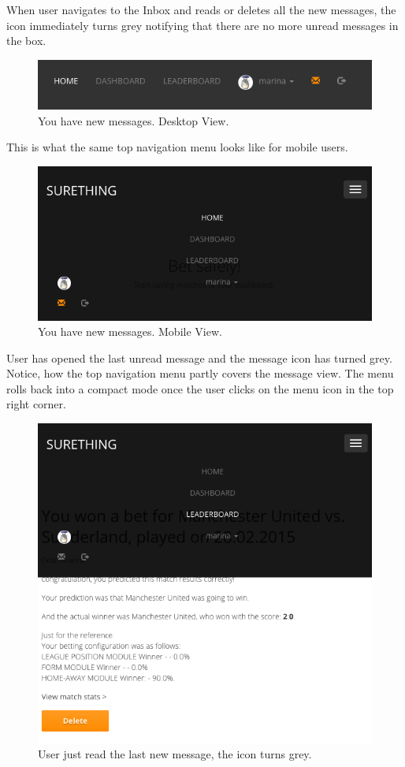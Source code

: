 When user navigates to the Inbox and reads or deletes all the new messages, the icon immediately turns grey notifying that there are no more unread messages in the box.
 
\begin{figure}[H]
	\begin{center}
		\includegraphics[width=.60\linewidth,natwidth=610,natheight=642]{impl/images/newMessagesDesktopView}
		\caption{You have new messages. Desktop View.} \label{fig:newMessagesDesktopView}
	\end{center}
\end{figure}

This is what the same top navigation menu looks like for mobile users. 

\begin{figure}[H]
	\begin{center}
		\includegraphics[width=.60\linewidth,natwidth=610,natheight=642]{impl/images/newMessagesMobileView}
		\caption{You have new messages. Mobile View.} \label{fig:newMessagesMobileView}
	\end{center}
\end{figure}

User has opened the last unread message and the message icon has turned grey. Notice, how the top navigation menu partly covers the message view. The menu rolls back into a compact mode once the user clicks on the menu icon in the top right corner.

\begin{figure}[H]
	\begin{center}
		\includegraphics[width=.60\linewidth,natwidth=610,natheight=642]{impl/images/noMoreNewMessages}
		\caption{User just read the last new message, the icon turns grey.} \label{fig:noMoreNewMessages}
	\end{center}
\end{figure}

